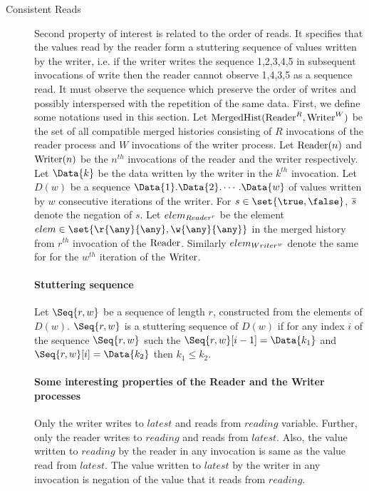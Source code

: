 \begin{description}
\item [Consistent Reads]
Second property of interest is related to the order of reads. It specifies that the values read by the reader form a stuttering sequence of values written by the writer, i.e. if the writer writes the sequence 1,2,3,4,5 in subsequent invocations of write then the reader cannot observe 1,4,3,5 as a sequence read. It must observe the sequence which preserve the order of writes and possibly interspersed with the repetition of the same data. First, we define some notations used in this section.
Let $\MergedHist(\Reader^R,\Writer^W)$ be the set of all compatible merged histories consisting of $R$ invocations of the reader process and $W$ invocations of the writer process. 
Let $\Reader(n)$ and $\Writer(n)$ be the $n^{th}$ invocations of the reader and the writer respectively. Let $\Data{k}$ be the data written by the writer in the $k^{th}$ invocation. 
Let $D(w)$ be a sequence $\Data{1}.\Data{2}.\cdots.\Data{w}$ of values written by $w$ consecutive iterations of the writer. For $s\in \set{\true,\false}$, $\n{s}$ denote the negation of $s$.
Let $\call{Reader}{r}{elem}$ be the element $elem\in \set{\r{\any}{\any},\w{\any}{\any}}$ in the merged history from $r^{th}$ invocation of the $\Reader$. Similarly $\call{Writer}{w}{elem}$ denote the same for for the $w^{th}$ iteration of the $\Writer$.

\paragraph{\textbf{Stuttering sequence}}
 Let $\Seq{r,w}$ be a sequence of length $r$, constructed from the elements of $D(w)$. $\Seq{r,w}$ is a stuttering sequence of $D(w)$ if for any index $i$ of the sequence $\Seq{r,w}$ such the $\Seq{r,w}[i-1]=\Data{k_1}$ and $\Seq{r,w}[i]=\Data{k_2}$ then $k_1 \le k_2$. 
 



\paragraph{\textbf{Some interesting properties of the Reader and the Writer processes}}
Only the writer writes to $latest$ and reads from $reading$ variable. Further, only the reader writes to $reading$ and reads from $latest$. Also, the value written to $reading$ by the reader in any invocation is same as the value read from $latest$. The value written to $latest$ by the writer in any invocation is negation of the value that it reads from $reading$. 



\end{description}
